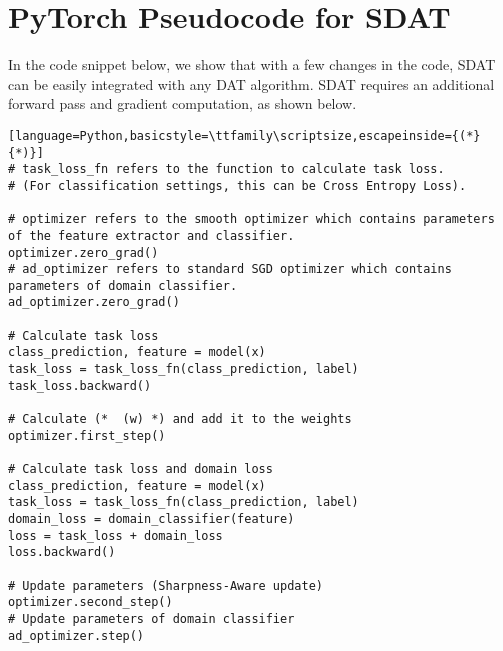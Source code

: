 \documentclass[table,dvipsnames]{article}
\theoremstyle{plain}
\theoremstyle{definition}
\theoremstyle{remark}
\begin{document}
\section{PyTorch Pseudocode for SDAT}
In the code snippet below, we show that with a few changes in the code, SDAT can be easily integrated with any DAT algorithm. SDAT requires an additional forward pass and gradient computation, as shown below.
\label{app:pytorchcode}
\begin{lstlisting}[language=Python,basicstyle=\ttfamily\scriptsize,escapeinside={(*}{*)}]
# task_loss_fn refers to the function to calculate task loss. 
# (For classification settings, this can be Cross Entropy Loss).

# optimizer refers to the smooth optimizer which contains parameters of the feature extractor and classifier.
optimizer.zero_grad()
# ad_optimizer refers to standard SGD optimizer which contains parameters of domain classifier.
ad_optimizer.zero_grad()

# Calculate task loss
class_prediction, feature = model(x)
task_loss = task_loss_fn(class_prediction, label)
task_loss.backward()

# Calculate (*  (w) *) and add it to the weights
optimizer.first_step()

# Calculate task loss and domain loss
class_prediction, feature = model(x)
task_loss = task_loss_fn(class_prediction, label)
domain_loss = domain_classifier(feature)
loss = task_loss + domain_loss
loss.backward()

# Update parameters (Sharpness-Aware update)
optimizer.second_step()
# Update parameters of domain classifier
ad_optimizer.step()
\end{lstlisting}
\end{document}
